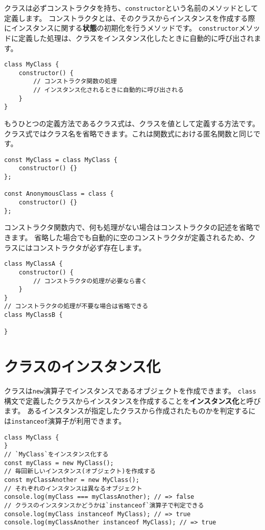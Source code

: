 クラスは必ずコンストラクタを持ち、\texttt{constructor}という名前のメソッドとして定義します。
コンストラクタとは、そのクラスからインスタンスを作成する際にインスタンスに関する\textbf{状態}の初期化を行うメソッドです。
\texttt{constructor}メソッドに定義した処理は、クラスをインスタンス化したときに自動的に呼び出されます。

\begin{lstlisting}
class MyClass {
    constructor() {
        // コンストラクタ関数の処理
        // インスタンス化されるときに自動的に呼び出される
    }
}
\end{lstlisting}

もうひとつの定義方法であるクラス式は、クラスを値として定義する方法です。
クラス式ではクラス名を省略できます。これは関数式における匿名関数と同じです。

\begin{lstlisting}
const MyClass = class MyClass {
    constructor() {}
};

const AnonymousClass = class {
    constructor() {}
};
\end{lstlisting}

コンストラクタ関数内で、何も処理がない場合はコンストラクタの記述を省略できます。
省略した場合でも自動的に空のコンストラクタが定義されるため、クラスにはコンストラクタが必ず存在します。

\begin{lstlisting}
class MyClassA {
    constructor() {
        // コンストラクタの処理が必要なら書く
    }
}
// コンストラクタの処理が不要な場合は省略できる
class MyClassB {

}
\end{lstlisting}

\hypertarget{class-instance}{%
\section{クラスのインスタンス化}\label{class-instance}}

クラスは\texttt{new}演算子でインスタンスであるオブジェクトを作成できます。
\texttt{class}構文で定義したクラスからインスタンスを作成することを\textbf{インスタンス化}と呼びます。
あるインスタンスが指定したクラスから作成されたものかを判定するには\texttt{instanceof}演算子が利用できます。

\begin{lstlisting}
class MyClass {
}
// `MyClass`をインスタンス化する
const myClass = new MyClass();
// 毎回新しいインスタンス(オブジェクト)を作成する
const myClassAnother = new MyClass();
// それぞれのインスタンスは異なるオブジェクト
console.log(myClass === myClassAnother); // => false
// クラスのインスタンスかどうかは`instanceof`演算子で判定できる
console.log(myClass instanceof MyClass); // => true
console.log(myClassAnother instanceof MyClass); // => true
\end{lstlisting}

